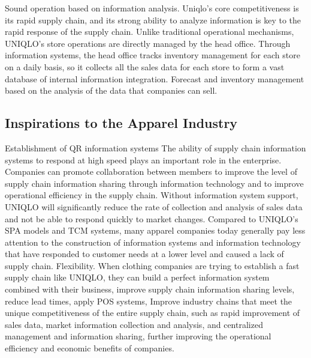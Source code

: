 \documentclass[12pt,]{article}
\begin{document}
Sound operation based on information analysis. Uniqlo's core
competitiveness is its rapid supply chain, and its strong ability to
analyze information is key to the rapid response of the supply chain.
Unlike traditional operational mechanisms, UNIQLO's store operations are
directly managed by the head office. Through information systems, the
head office tracks inventory management for each store on a daily basis,
so it collects all the sales data for each store to form a vast database
of internal information integration. Forecast and inventory management
based on the analysis of the data that companies can sell.

\hypertarget{inspirations-to-the-apparel-industry}{%
\subsection{Inspirations to the Apparel
Industry}\label{inspirations-to-the-apparel-industry}}

Establishment of QR information systems The ability of supply chain
information systems to respond at high speed plays an important role in
the enterprise. Companies can promote collaboration between members to
improve the level of supply chain information sharing through
information technology and to improve operational efficiency in the
supply chain. Without information system support, UNIQLO will
significantly reduce the rate of collection and analysis of sales data
and not be able to respond quickly to market changes. Compared to
UNIQLO's SPA models and TCM systems, many apparel companies today
generally pay less attention to the construction of information systems
and information technology that have responded to customer needs at a
lower level and caused a lack of supply chain. Flexibility. When
clothing companies are trying to establish a fast supply chain like
UNIQLO, they can build a perfect information system combined with their
business, improve supply chain information sharing levels, reduce lead
times, apply POS systems, Improve industry chains that meet the unique
competitiveness of the entire supply chain, such as rapid improvement of
sales data, market information collection and analysis, and centralized
management and information sharing, further improving the operational
efficiency and economic benefits of companies.
\end{document}
